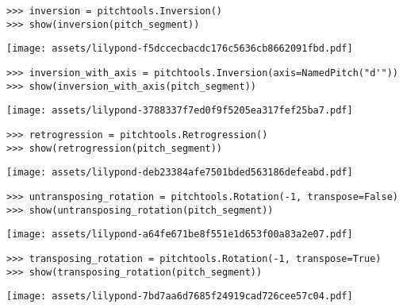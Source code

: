 \begin{comment}
<abjad>
inversion = pitchtools.Inversion()
show(inversion(pitch_segment))
inversion_with_axis = pitchtools.Inversion(axis=NamedPitch("d'"))
show(inversion_with_axis(pitch_segment))
</abjad>
\end{comment}

\begin{singlespacing}
\vspace{-0.5\baselineskip}
\begin{lstlisting}
>>> inversion = pitchtools.Inversion()
>>> show(inversion(pitch_segment))
\end{lstlisting}
\noindent\texttt{[image: assets/lilypond-f5dccecbacdc176c5636cb8662091fbd.pdf]}
\begin{lstlisting}
>>> inversion_with_axis = pitchtools.Inversion(axis=NamedPitch("d'"))
>>> show(inversion_with_axis(pitch_segment))
\end{lstlisting}
\noindent\texttt{[image: assets/lilypond-3788337f7ed0f9f5205ea317fef25ba7.pdf]}
\end{singlespacing}

\begin{comment}
<abjad>
retrogression = pitchtools.Retrogression()
show(retrogression(pitch_segment))
</abjad>
\end{comment}

\begin{singlespacing}
\vspace{-0.5\baselineskip}
\begin{lstlisting}
>>> retrogression = pitchtools.Retrogression()
>>> show(retrogression(pitch_segment))
\end{lstlisting}
\noindent\texttt{[image: assets/lilypond-deb23384afe7501bded563186defeabd.pdf]}
\end{singlespacing}

\begin{comment}
<abjad>
untransposing_rotation = pitchtools.Rotation(-1, transpose=False)
show(untransposing_rotation(pitch_segment))
transposing_rotation = pitchtools.Rotation(-1, transpose=True)
show(transposing_rotation(pitch_segment))
</abjad>
\end{comment}

\begin{singlespacing}
\vspace{-0.5\baselineskip}
\begin{lstlisting}
>>> untransposing_rotation = pitchtools.Rotation(-1, transpose=False)
>>> show(untransposing_rotation(pitch_segment))
\end{lstlisting}
\noindent\texttt{[image: assets/lilypond-a64fe671be8f551e1d653f00a83a2e07.pdf]}
\begin{lstlisting}
>>> transposing_rotation = pitchtools.Rotation(-1, transpose=True)
>>> show(transposing_rotation(pitch_segment))
\end{lstlisting}
\noindent\texttt{[image: assets/lilypond-7bd7aa6d7685f24919cad726cee57c04.pdf]}
\end{singlespacing}

